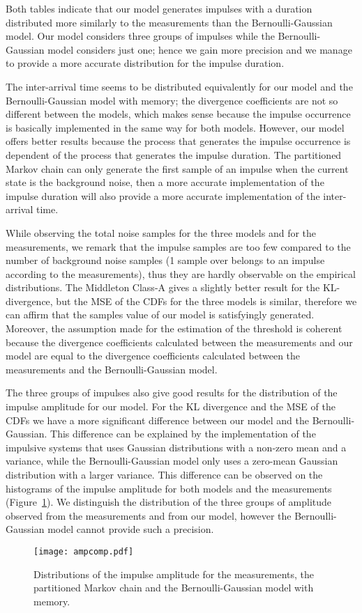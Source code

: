 \documentclass[journal]{IEEEtran}
\begin{document}
Both tables indicate that our model generates impulses with a duration distributed more similarly to the measurements than the Bernoulli-Gaussian model. Our model considers three groups of impulses while the Bernoulli-Gaussian model considers just one; hence we gain more precision and we manage to provide a more accurate distribution for the impulse duration.\

The inter-arrival time seems to be distributed equivalently for our model and the Bernoulli-Gaussian model with memory; the divergence coefficients are not so different between the models, which makes sense because the impulse occurrence is basically implemented in the same way for both models. However, our model offers better results because the process that generates the impulse occurrence is dependent of the process that generates the impulse duration. The partitioned Markov chain can only generate the first sample of an impulse when the current state is the background noise, then a more accurate implementation of the impulse duration will also provide a more accurate implementation of the inter-arrival time.\

While observing the total noise samples for the three models and for the measurements, we remark that the impulse samples are too few compared to the number of background noise samples (1 sample over  belongs to an impulse according to the measurements), thus they are hardly observable on the empirical distributions. The Middleton Class-A gives a slightly better result for the KL-divergence, but the MSE of the CDFs for the three models is similar, therefore we can affirm that the samples value of our model is satisfyingly generated. Moreover, the assumption made for the estimation of the threshold  is coherent because the divergence coefficients calculated between the measurements and our model are equal to the divergence coefficients calculated between the measurements and the Bernoulli-Gaussian model.\

The three groups of impulses also give good results for the distribution of the impulse amplitude for our model. For the KL divergence and the MSE of the CDFs we have a more significant difference between our model and the Bernoulli-Gaussian. This difference can be explained by the implementation of the impulsive systems that uses Gaussian distributions with a non-zero mean and a variance, while the Bernoulli-Gaussian model only uses a zero-mean Gaussian distribution with a larger variance. This difference can be observed on the histograms of the impulse amplitude for both models and the measurements (Figure~\ref{AMPCOMP}). We distinguish the distribution of the three groups of amplitude observed from the measurements and from our model, however the Bernoulli-Gaussian model cannot provide such a precision.\
\begin{figure}
\texttt{[image: ampcomp.pdf]}\\
  \caption{Distributions of the impulse amplitude for the measurements, the partitioned Markov chain and the Bernoulli-Gaussian model with memory.}\label{AMPCOMP}
\end{figure}
\end{document}
